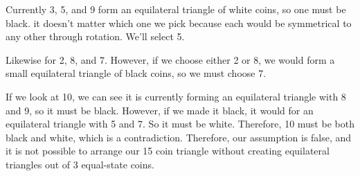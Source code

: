 \documentclass[12pt]{article}
\begin{document}
Currently 3, 5, and 9 form an equilateral triangle of white coins, so one must be black. it doesn't matter which one we pick because each would be symmetrical to any other through rotation. We'll select 5.

\begin{center}
\end{center}

Likewise for 2, 8, and 7. However, if we choose either 2 or 8, we would form a small equilateral triangle of black coins, so we must choose 7.

\begin{center}
\end{center}

If we look at 10, we can see it is currently forming an equilateral triangle with 8 and 9, so it must be black. However, if we made it black, it would for an equilateral triangle with 5 and 7. So it must be white. Therefore, 10 must be both black and white, which is a contradiction. Therefore, our assumption is false, and it is not possible to arrange our 15 coin triangle without creating equilateral triangles out of 3 equal-state coins.
\end{document}
